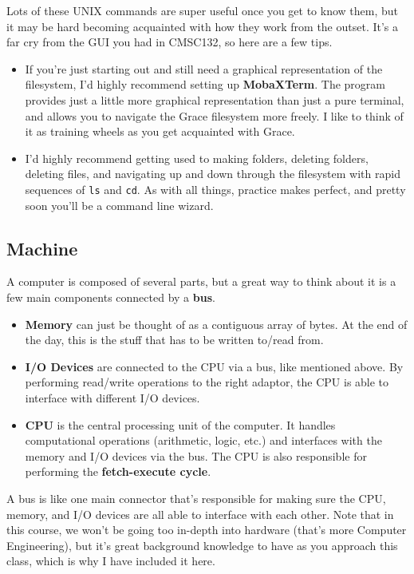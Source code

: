 \documentclass[english, 10pt]{article}
\begin{document}
Lots of these UNIX commands are super useful once you get to know them, but it may be hard becoming acquainted with how they work from the outset. It's a far cry from the GUI you had in CMSC132, so here are a few tips.

\begin{itemize}
	\item If you're just starting out and still need a graphical representation of the filesystem, I'd highly recommend setting up \textbf{MobaXTerm}. The program provides just a little more graphical representation than just a pure terminal, and allows you to navigate the Grace filesystem more freely. I like to think of it as training wheels as you get acquainted with Grace.
	\item I'd highly recommend getting used to making folders, deleting folders, deleting files, and navigating up and down through the filesystem with rapid sequences of \texttt{ls} and \texttt{cd}. As with all things, practice makes perfect, and pretty soon you'll be a command line wizard.
\end{itemize}

\subsection{Machine}

A computer is composed of several parts, but a great way to think about it is a few main components connected by a \textbf{bus}. \newline

\begin{itemize}
	\item \textbf{Memory} can just be thought of as a contiguous array of bytes. At the end of the day, this is the stuff that has to be written to/read from.
	\item \textbf{I/O Devices} are connected to the CPU via a bus, like mentioned above. By performing read/write operations to the right adaptor, the CPU is able to interface with different I/O devices.
	\item \textbf{CPU} is the central processing unit of the computer. It handles computational operations (arithmetic, logic, etc.) and interfaces with the memory and I/O devices via the bus. The CPU is also responsible for performing the \textbf{fetch-execute cycle}.
\end{itemize}

A bus is like one main connector that's responsible for making sure the CPU, memory, and I/O devices are all able to interface with each other.\newline\newline
Note that in this course, we won't be going too in-depth into hardware (that's more Computer Engineering), but it's great background knowledge to have as you approach this class, which is why I have included it here.
\end{document}
